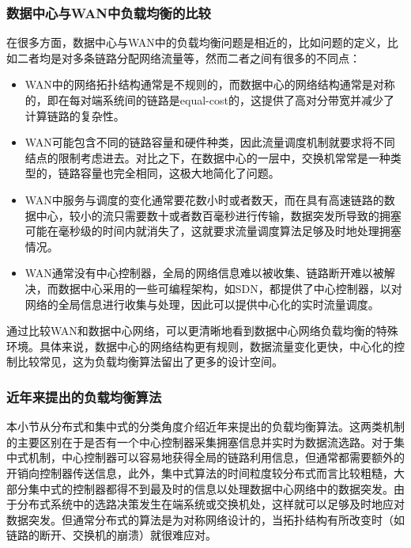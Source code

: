 \subsubsection{数据中心与WAN中负载均衡的比较}

在很多方面，数据中心与WAN中的负载均衡问题是相近的，比如问题的定义，比如二者均是对多条链路分配网络流量等，然而二者之间有很多的不同点：
\begin{itemize}
    \item WAN中的网络拓扑结构通常是不规则的，而数据中心的网络结构通常是对称的，即在每对端系统间的链路是equal-cost的，这提供了高对分带宽并减少了计算链路的复杂性。
    \item WAN可能包含不同的链路容量和硬件种类，因此流量调度机制就要求将不同结点的限制考虑进去。对比之下，在数据中心的一层中，交换机常常是一种类型的，链路容量也完全相同，这极大地简化了问题。
    \item WAN中服务与调度的变化通常要花数小时或者数天，而在具有高速链路的数据中心，较小的流只需要数十或者数百毫秒进行传输，数据突发所导致的拥塞可能在毫秒级的时间内就消失了，这就要求流量调度算法足够及时地处理拥塞情况。
    \item WAN通常没有中心控制器，全局的网络信息难以被收集、链路断开难以被解决，而数据中心采用的一些可编程架构，如SDN，都提供了中心控制器，以对网络的全局信息进行收集与处理，因此可以提供中心化的实时流量调度。
\end{itemize}

通过比较WAN和数据中心网络，可以更清晰地看到数据中心网络负载均衡的特殊环境。具体来说，数据中心的网络结构更有规则，数据流量变化更快，中心化的控制比较常见，这为负载均衡算法留出了更多的设计空间。

\subsubsection{近年来提出的负载均衡算法}

本小节从分布式和集中式的分类角度介绍近年来提出的负载均衡算法。这两类机制的主要区别在于是否有一个中心控制器采集拥塞信息并实时为数据流选路。对于集中式机制，中心控制器可以容易地获得全局的链路利用信息，但通常都需要额外的开销向控制器传送信息，此外，集中式算法的时间粒度较分布式而言比较粗糙，大部分集中式的控制器都得不到最及时的信息以处理数据中心网络中的数据突发。由于分布式系统中的选路决策发生在端系统或交换机处，这样就可以足够及时地应对数据突发。但通常分布式的算法是为对称网络设计的，当拓扑结构有所改变时（如链路的断开、交换机的崩溃）就很难应对。

